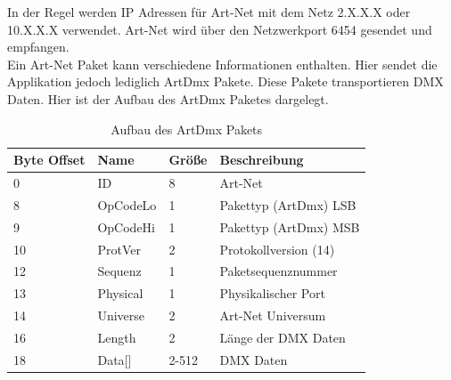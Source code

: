 \documentclass[11pt]{scrartcl}
\begin{document}
\noindent
In der Regel werden IP Adressen für Art-Net mit dem Netz 2.X.X.X oder 10.X.X.X verwendet. Art-Net wird über den
Netzwerkport 6454 gesendet und empfangen.\\
Ein Art-Net Paket kann verschiedene Informationen enthalten. Hier sendet die Applikation jedoch
lediglich ArtDmx Pakete. Diese Pakete transportieren DMX Daten. Hier ist der Aufbau des ArtDmx Paketes dargelegt.
\begin{table}[H]
    \begin{tabularx}{\textwidth}{|l|l|l|X|}
        \hline Byte Offset & Name & Größe & Beschreibung\\\hline
        0 & ID & 8 & Art-Net\\\hline
        8 & OpCodeLo & 1 & Pakettyp (ArtDmx) LSB\\\hline
        9 & OpCodeHi & 1 & Pakettyp (ArtDmx) MSB\\\hline
        10 & ProtVer & 2 & Protokollversion (14)\\\hline
        12 & Sequenz & 1 & Paketsequenznummer\\\hline
        13 & Physical & 1 & Physikalischer Port\\\hline
        14 & Universe & 2 & Art-Net Universum\\\hline
        16 & Length & 2 & Länge der DMX Daten\\\hline
        18 & Data[] & 2-512 & DMX Daten\\\hline
    \end{tabularx}
    \caption{Aufbau des ArtDmx Pakets}\label{tab:ArtDmxDefinition}
\end{table}
\noindent
\cite{artdmx}
\clearpage
\end{document}
